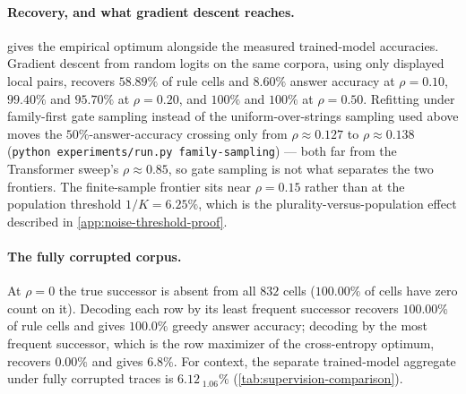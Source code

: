 \paragraph{Recovery, and what gradient descent reaches.}
 gives the empirical optimum alongside the measured
trained-model accuracies.  Gradient descent from random logits on the same
corpora, using only displayed local pairs, recovers $58.89\%$ of rule cells
and $8.60\%$ answer accuracy at $\rho=0.10$, $99.40\%$ and $95.70\%$ at
$\rho=0.20$, and $100\%$ and $100\%$ at $\rho=0.50$. Refitting under
family-first gate sampling instead of the uniform-over-strings sampling
used above moves the $50\%$-answer-accuracy crossing only from
$\rho\approx0.127$ to $\rho\approx0.138$
(\texttt{python experiments/run.py family-sampling}) --- both far from the
Transformer sweep's $\rho\approx0.85$, so gate sampling is not what
separates the two frontiers.  The finite-sample
frontier sits near $\rho=0.15$ rather than at the population threshold
$1/K=6.25\%$, which is the plurality-versus-population effect described in
\cref{app:noise-threshold-proof}.

\paragraph{The fully corrupted corpus.}
At $\rho=0$ the true successor is absent from all $832$ cells
($100.00\%$ of cells have zero count on it).  Decoding each row by its least
frequent successor recovers $100.00\%$ of rule cells and gives $100.0\%$ greedy
answer accuracy; decoding by the most frequent successor, which is the row
maximizer of the cross-entropy optimum, recovers $0.00\%$ and gives $6.8\%$.
For context, the separate trained-model aggregate under fully corrupted traces
is $6.12_{\;\text{1.06}}\%$ (\cref{tab:supervision-comparison}).

